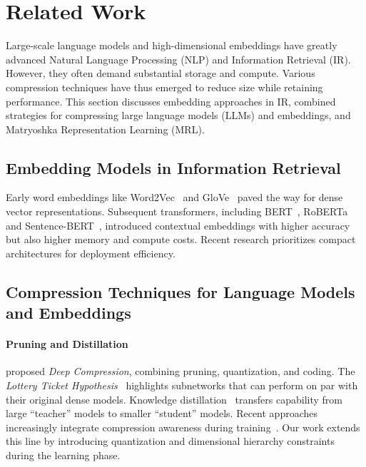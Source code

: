 \section{Related Work}
\label{sec:related_work}

Large-scale language models and high-dimensional embeddings have greatly advanced Natural Language Processing (NLP) and Information Retrieval (IR). 
However, they often demand substantial storage and compute. Various compression techniques have thus emerged to reduce size while retaining performance. 
This section discusses embedding approaches in IR, combined strategies for compressing large language models (LLMs) and embeddings, and Matryoshka Representation Learning (MRL).

\subsection{Embedding Models in Information Retrieval}
Early word embeddings like Word2Vec~\cite{mikolov2013distributed} and GloVe~\cite{pennington2014glove} paved the way for dense vector representations. Subsequent transformers, including BERT~\cite{devlin2019bert}, RoBERTa~\cite{liu2019roberta} and Sentence-BERT~\cite{reimers-2019-sentence-bert}, introduced contextual embeddings with higher accuracy but also higher memory and compute costs. 
Recent research prioritizes compact architectures for deployment efficiency.

\subsection{Compression Techniques for Language Models and Embeddings}
\paragraph{Pruning and Distillation}
\citet{han2015deep} proposed \emph{Deep Compression}, combining pruning, quantization, and coding. The \emph{Lottery Ticket Hypothesis}~\cite{frankle2019lottery} highlights subnetworks that can perform on par with their original dense models. 
Knowledge distillation~\cite{hinton2015distilling, sanh2019distilbert, jiao2020tinybert} transfers capability from large “teacher” models to smaller “student” models.
Recent approaches increasingly integrate compression awareness during training~\cite{shen2021efficient,wang-etal-2024-compression}. 
Our work extends this line by introducing quantization and dimensional hierarchy constraints during the learning phase.


